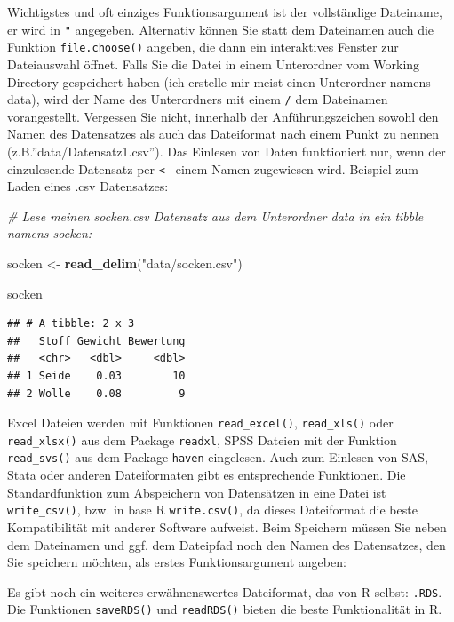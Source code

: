 \documentclass[
  ngerman,
]{book}
\newenvironment{Shaded}{\begin{snugshade}}{\end{snugshade}}
\newcommand{\CommentTok}[1]{\textcolor[rgb]{0.56,0.35,0.01}{\textit{#1}}}
\newcommand{\FunctionTok}[1]{\textcolor[rgb]{0.13,0.29,0.53}{\textbf{#1}}}
\newcommand{\NormalTok}[1]{#1}
\newcommand{\OtherTok}[1]{\textcolor[rgb]{0.56,0.35,0.01}{#1}}
\newcommand{\StringTok}[1]{\textcolor[rgb]{0.31,0.60,0.02}{#1}}
\begin{document}
Wichtigstes und oft einziges Funktionsargument ist der vollständige Dateiname, er wird in \texttt{"} angegeben. Alternativ können Sie statt dem Dateinamen auch die Funktion \texttt{file.choose()} angeben, die dann ein interaktives Fenster zur Dateiauswahl öffnet. Falls Sie die Datei in einem Unterordner vom Working Directory gespeichert haben (ich erstelle mir meist einen Unterordner namens data), wird der Name des Unterordners mit einem \texttt{/} dem Dateinamen vorangestellt. Vergessen Sie nicht, innerhalb der Anführungszeichen sowohl den Namen des Datensatzes als auch das Dateiformat nach einem Punkt zu nennen (z.B.''data/Datensatz1.csv''). Das Einlesen von Daten funktioniert nur, wenn der einzulesende Datensatz per \texttt{\textless{}-} einem Namen zugewiesen wird. Beispiel zum Laden eines .csv Datensatzes:

\begin{Shaded}
\begin{Highlighting}[]
\CommentTok{\# Lese meinen socken.csv Datensatz aus dem Unterordner data in ein tibble namens socken:}

\NormalTok{socken }\OtherTok{\textless{}{-}} \FunctionTok{read\_delim}\NormalTok{(}\StringTok{"data/socken.csv"}\NormalTok{) }

\NormalTok{socken }
\end{Highlighting}
\end{Shaded}

\begin{verbatim}
## # A tibble: 2 x 3
##   Stoff Gewicht Bewertung
##   <chr>   <dbl>     <dbl>
## 1 Seide    0.03        10
## 2 Wolle    0.08         9
\end{verbatim}

Excel Dateien werden mit Funktionen \texttt{read\_excel()}, \texttt{read\_xls()} oder \texttt{read\_xlsx()} aus dem Package \texttt{readxl}, SPSS Dateien mit der Funktion \texttt{read\_svs()} aus dem Package \texttt{haven} eingelesen. Auch zum Einlesen von SAS, Stata oder anderen Dateiformaten gibt es entsprechende Funktionen. Die Standardfunktion zum Abspeichern von Datensätzen in eine Datei ist \texttt{write\_csv()}, bzw. in base R \texttt{write.csv()}, da dieses Dateiformat die beste Kompatibilität mit anderer Software aufweist. Beim Speichern müssen Sie neben dem Dateinamen und ggf. dem Dateipfad noch den Namen des Datensatzes, den Sie speichern möchten, als erstes Funktionsargument angeben:

Es gibt noch ein weiteres erwähnenswertes Dateiformat, das von R selbst: \texttt{.RDS}. Die Funktionen \texttt{saveRDS()} und \texttt{readRDS()} bieten die beste Funktionalität in R.
\end{document}
